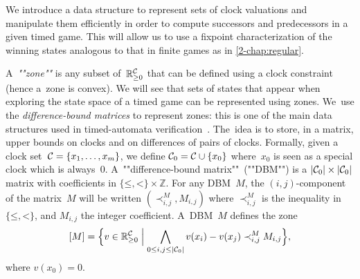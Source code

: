 We introduce a data structure to represent sets of clock
valuations and manipulate them efficiently in order to compute
successors and predecessors in a given timed game. This will allow us
to use a fixpoint characterization of the winning states analogous to
that in finite games as in \cref{2-chap:regular}.

A~\emph{""zone""} is any subset of~$\mathbb{R}_{\geq 0}^{\mathcal{C}}$ that can be defined
using a clock constraint (hence a~zone is convex).  We will see that
sets of states that appear when exploring the state space of a timed
game can be represented using zones.  We~use the
\emph{difference-bound matrices} to represent zones:
this is one of the main data structures used in timed-automata
verification~\cite{Dil90,BM83}. The~idea is to store, in a matrix,
upper bounds on clocks and on differences of pairs of clocks.
Formally, given a clock
set~$\mathcal{C}=\{x_1,\ldots,x_m\}$, we define $\mathcal{C}_0 = \mathcal{C} \cup \{x_0\}$
where~$x_0$ is seen as a
special clock which is always~$0$.
A~""difference-bound matrix""~(""DBM"") is a $|\mathcal{C}_0|\times |\mathcal{C}_0|$
matrix with coefficients in $\{\mathord\leq,\mathord<\} \times
\mathbb{Z}$.  For any DBM~$M$, the $(i,j)$-component of the matrix~$M$
will be written $(\prec^M_{i,j}, M_{i,j})$ where $\prec^M_{i,j}$ is
the inequality in~$\{\mathord\leq,\mathord<\}$, and $M_{i,j}$ the
integer coefficient. A~DBM~$M$ defines the zone
\[
  [M] = \Bigl\{v\in \mathbb{R}_{\geq 0}^{\mathcal{C}}\Bigm|
  \bigwedge_{0\leq i,j \leq |\mathcal{C}_0|} v(x_i)-v(x_j) \prec^M_{i,j} M_{i,j}\Bigr\},
\]
where $v(x_0) = 0$.

